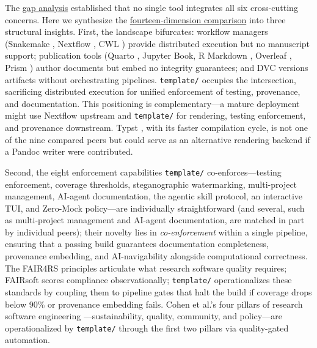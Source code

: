 \documentclass[
]{article}
\begin{document}
The \href{02_introduction.md\#the-gap}{gap analysis} established that no
single tool integrates all six cross-cutting concerns. Here we
synthesize the
\href{08f_appendix_matrix.md\#appendix-matrix}{fourteen-dimension
comparison} into three structural insights. First, the landscape
bifurcates: workflow managers (Snakemake \citep{koster2012snakemake},
Nextflow \citep{ditommaso2017nextflow}, CWL \citep{amstutz2016cwl})
provide distributed execution but no manuscript support; publication
tools (Quarto \citep{allaire2024quarto}, Jupyter Book, R Markdown
\citep{xie2018dynamic}, Overleaf \citep{overleaf2025}, Prism
\citep{openai2026prism}) author documents but embed no integrity
guarantees; and DVC \citep{iterative2024dvc} versions artifacts without
orchestrating pipelines. \texttt{template/} occupies the intersection,
sacrificing distributed execution for unified enforcement of testing,
provenance, and documentation. This positioning is complementary---a
mature deployment might use Nextflow upstream and \texttt{template/} for
rendering, testing enforcement, and provenance downstream. Typst
\citep{madje2023typst}, with its faster compilation cycle, is not one of
the nine compared peers but could serve as an alternative rendering
backend if a Pandoc writer were contributed.

Second, the eight enforcement capabilities \texttt{template/}
co-enforces---testing enforcement, coverage thresholds, steganographic
watermarking, multi-project management, AI-agent documentation, the
agentic skill protocol, an interactive TUI, and Zero-Mock policy---are
individually straightforward (and several, such as multi-project
management and AI-agent documentation, are matched in part by individual
peers); their novelty lies in \emph{co-enforcement} within a single
pipeline, ensuring that a passing build guarantees documentation
completeness, provenance embedding, and AI-navigability alongside
computational correctness. The FAIR4RS principles
\citep{barker2022fair4rs, lamprecht2020towards} articulate what research
software quality requires; FAIRsoft \citep{garijo2024fairsoft} scores
compliance observationally; \texttt{template/} operationalizes these
standards by coupling them to pipeline gates that halt the build if
coverage drops below 90\% or provenance embedding fails. Cohen et al.'s
four pillars of research software engineering
\citep{cohen2021four}---sustainability, quality, community, and
policy---are operationalized by \texttt{template/} through the first two
pillars via quality-gated automation.
\end{document}
